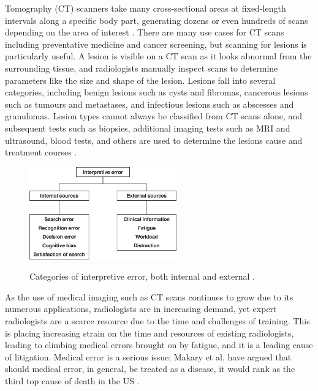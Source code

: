  Tomography (CT) scanners take many cross-sectional areas at fixed-length intervals along a specific body part, generating dozens or even hundreds of scans depending on the area of interest \cite{PMID:33620865}. There are many use cases for CT scans including preventative medicine and cancer screening, but scanning for lesions is particularly useful. A lesion is visible on a CT scan as it looks abnormal from the surrounding tissue, and radiologists manually inspect scans to determine parameters like the size and shape of the lesion. Lesions fall into several categories, including benign lesions such as cysts and fibromas, cancerous lesions such as tumours and metastases, and infectious lesions such as abscesses and granulomas. Lesion types cannot always be classified from CT scans alone, and subsequent tests such as biopsies, additional imaging tests such as MRI and ultrasound, blood tests, and others are used to determine the lesions cause and treatment courses \cite{oncology}.

\begin{figure}
 \begin{center}
 \includegraphics[width=2.5in]{images/scan_error.jpeg}\\
 \caption{Categories of interpretive error, both internal and external \cite{radiology_error}.}\label{interpret_error}
 \end{center}
\end{figure}

As the use of medical imaging such as CT scans continues to grow due to its numerous applications, radiologists are in increasing demand, yet expert radiologists are a scarce resource due to the time and challenges of training. This is placing increasing strain on the time and resources of existing radiologists, leading to climbing medical errors brought on by fatigue, and it is a leading cause of litigation. Medical error is a serious issue; Makary et al. have argued that should medical error, in general, be treated as a disease, it would rank as the third top cause of death in the US \cite{medical_error}. 


